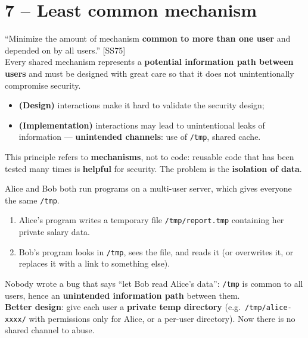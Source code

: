\section{7 -- Least common mechanism}

\begin{defnbox}[title=Least common mechanism]
``Minimize the amount of mechanism \textbf{common to more than one user} and depended on
by all users.'' [SS75] \\
Every shared mechanism represents a \textbf{potential information path between users}
and must be designed with great care so that it does not unintentionally compromise
security.
\end{defnbox}

\begin{propbox}[title=Link with economy of mechanism]
\begin{itemize}
  \item \textbf{(Design)} interactions make it hard to validate the security design;
  \item \textbf{(Implementation)} interactions may lead to unintentional leaks of
        information --- \textbf{unintended channels}: use of \texttt{/tmp}, shared cache.
\end{itemize}
\end{propbox}

\begin{warnbox}[title={Mechanisms, not code}]
This principle refers to \textbf{mechanisms}, not to code: reusable code that has been
tested many times is \textbf{helpful} for security. The problem is the
\textbf{isolation of data}.
\end{warnbox}

\begin{exbox}[title=Two users sharing \texttt{/tmp}]
Alice and Bob both run programs on a multi-user server, which gives everyone the same
\texttt{/tmp}.
\begin{enumerate}
  \item Alice's program writes a temporary file \texttt{/tmp/report.tmp} containing her
        private salary data.
  \item Bob's program looks in \texttt{/tmp}, sees the file, and reads it (or overwrites
        it, or replaces it with a link to something else).
\end{enumerate}
Nobody wrote a bug that says ``let Bob read Alice's data'': \texttt{/tmp} is common to all
users, hence an \textbf{unintended information path} between them. \\
\textbf{Better design}: give each user a \textbf{private temp directory} (e.g.\
\texttt{/tmp/alice-xxxx/} with permissions only for Alice, or a per-user directory). Now
there is no shared channel to abuse.
\end{exbox}

